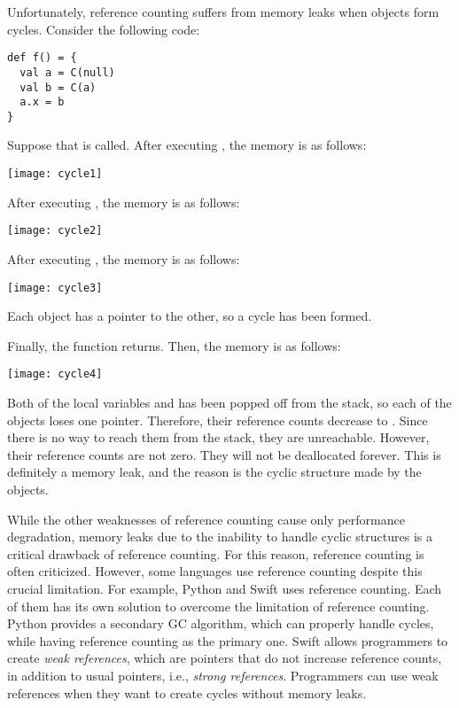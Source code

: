 Unfortunately, reference counting suffers from memory leaks when objects form
cycles. Consider the following code:

\begin{verbatim}
def f() = {
  val a = C(null)
  val b = C(a)
  a.x = b
}
\end{verbatim}

Suppose that  is called. After executing , the
memory is as follows:

\begin{center}
\texttt{[image: cycle1]}
\end{center}

After executing , the memory is as follows:

\begin{center}
\texttt{[image: cycle2]}
\end{center}

After executing , the memory is as follows:

\begin{center}
\texttt{[image: cycle3]}
\end{center}

Each object has a pointer to the other, so a cycle has been formed.

Finally, the function returns. Then, the memory is as follows:

\begin{center}
\texttt{[image: cycle4]}
\end{center}

Both of the local variables  and  has been popped off from the
stack, so each of the objects loses one pointer. Therefore, their reference
counts decrease to . Since there is no way to reach them from the stack,
they are unreachable. However, their reference counts are not zero. They will
not be deallocated forever. This is definitely a memory leak, and the reason is
the cyclic structure made by the objects.

While the other weaknesses of reference counting cause only performance
degradation, memory leaks due to the inability to handle cyclic structures is a
critical drawback of reference counting. For this reason, reference counting is
often criticized. However, some languages use reference counting despite this
crucial limitation. For example, Python and Swift uses reference counting. Each
of them has its own solution to overcome the limitation of reference counting.
Python provides a secondary GC algorithm, which can properly handle cycles,
while having reference counting as the primary
one. Swift allows
programmers to create \textit{weak references}, which are
pointers that do not increase reference counts, in addition to usual pointers,
i.e., \textit{strong references}.
Programmers can use weak references when they want to create cycles without
memory leaks.


